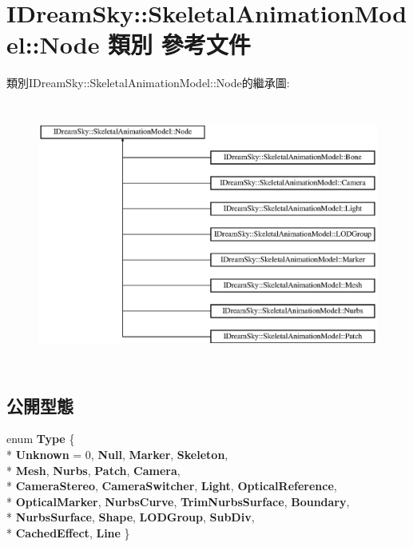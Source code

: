 \hypertarget{class_i_dream_sky_1_1_skeletal_animation_model_1_1_node}{}\section{I\+Dream\+Sky\+:\+:Skeletal\+Animation\+Model\+:\+:Node 類別 參考文件}
\label{class_i_dream_sky_1_1_skeletal_animation_model_1_1_node}
類別\+I\+Dream\+Sky\+:\+:Skeletal\+Animation\+Model\+:\+:Node的繼承圖\+:\begin{figure}[H]
\begin{center}
\leavevmode
\includegraphics[height=8.750000cm]{class_i_dream_sky_1_1_skeletal_animation_model_1_1_node}
\end{center}
\end{figure}
\subsection*{公開型態}
\begin{DoxyCompactItemize}
\item 
enum {\bfseries Type} \{ \\*
{\bfseries Unknown} = 0, 
{\bfseries Null}, 
{\bfseries Marker}, 
{\bfseries Skeleton}, 
\\*
{\bfseries Mesh}, 
{\bfseries Nurbs}, 
{\bfseries Patch}, 
{\bfseries Camera}, 
\\*
{\bfseries Camera\+Stereo}, 
{\bfseries Camera\+Switcher}, 
{\bfseries Light}, 
{\bfseries Optical\+Reference}, 
\\*
{\bfseries Optical\+Marker}, 
{\bfseries Nurbs\+Curve}, 
{\bfseries Trim\+Nurbs\+Surface}, 
{\bfseries Boundary}, 
\\*
{\bfseries Nurbs\+Surface}, 
{\bfseries Shape}, 
{\bfseries L\+O\+D\+Group}, 
{\bfseries Sub\+Div}, 
\\*
{\bfseries Cached\+Effect}, 
{\bfseries Line}
 \}\hypertarget{class_i_dream_sky_1_1_skeletal_animation_model_1_1_node_ace78de6d902e11aae6079441abfdc657}{}\label{class_i_dream_sky_1_1_skeletal_animation_model_1_1_node_ace78de6d902e11aae6079441abfdc657}

\end{DoxyCompactItemize}

